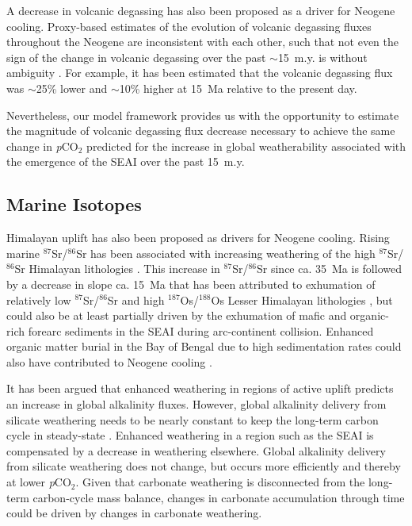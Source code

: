 \documentclass[9pt,twocolumn,twoside,lineno]{pnas-new}
\newcommand{\SrSr}{$^{87}$Sr/$^{86}$Sr\xspace}
\newcommand{\OsOs}{$^{187}$Os/$^{188}$Os\xspace}
\newcommand{\pCOtwo}{\textit{p}CO$_{2}$\xspace}
\begin{document}
A decrease in volcanic degassing \cite{Berner1983a} has also been proposed as a driver for Neogene cooling. Proxy-based estimates of the evolution of volcanic degassing fluxes throughout the Neogene are inconsistent with each other, such that not even the sign of the change in volcanic degassing over the past $\sim$15~m.y. is without ambiguity \cite{Godderis2017c}. For example, it has been estimated that the volcanic degassing flux was $\sim$25\% lower \cite{Cogne2006a} and $\sim$10\% higher \cite{Van-Der-Meer2014a} at 15~Ma relative to the present day.

Nevertheless, our model framework provides us with the opportunity to estimate the magnitude of volcanic degassing flux decrease necessary to achieve the same change in \pCOtwo predicted for the increase in global weatherability associated with the emergence of the SEAI over the past 15~m.y. 

\subsection*{Marine Isotopes}

Himalayan uplift \cite{Raymo1992a, Galy2007a} has also been proposed as drivers for Neogene cooling. Rising marine \SrSr has been associated with increasing weathering of the high \SrSr Himalayan lithologies \cite{Raymo1992a}. This increase in \SrSr since ca. 35~Ma is followed by a decrease in slope ca. 15~Ma that has been attributed to exhumation of relatively low \SrSr and high \OsOs Lesser Himalayan lithologies \cite{Colleps2018a}, but could also be at least partially driven by the exhumation of mafic and organic-rich forearc sediments in the SEAI during arc-continent collision. Enhanced organic matter burial in the Bay of Bengal due to high sedimentation rates could also have contributed to Neogene cooling \cite{Galy2007a}.

It has been argued that enhanced weathering in regions of active uplift predicts an increase in global alkalinity fluxes. However, global alkalinity delivery from silicate weathering needs to be nearly constant to keep the long-term carbon cycle in steady-state \cite{Kump1997a}. Enhanced weathering in a region such as the SEAI is compensated by a decrease in weathering elsewhere. Global alkalinity delivery from silicate weathering does not change, but occurs more efficiently and thereby at lower \pCOtwo. Given that carbonate weathering is disconnected from the long-term carbon-cycle mass balance, changes in carbonate accumulation through time \cite{Si2019a} could be driven by changes in carbonate weathering.
\end{document}
